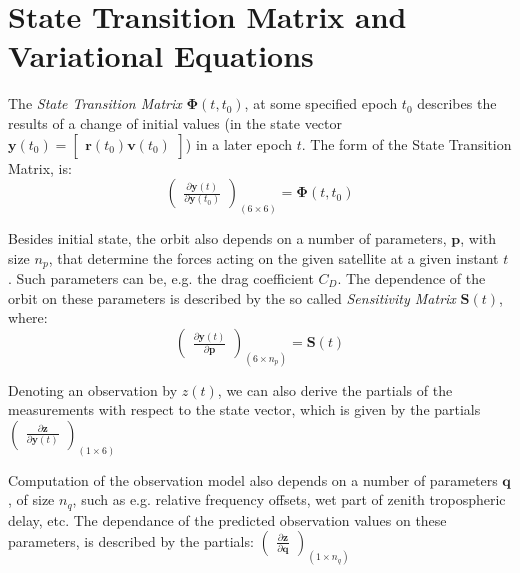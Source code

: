 \chapter{State Transition Matrix and Variational Equations}
\label{ch:state-transition-matrix-and-variational-equations}

The \emph{State Transition Matrix} $\bm{\Phi} (t, t_0 )$, at some specified epoch $t_0$ 
describes the results of a change of initial values (in the state vector 
$\bm{y}(t_0) = \begin{bmatrix} \bm{r}(t_0) \bm{v}(t_0) \end{bmatrix}$)
in a later epoch $t$. The form of the State Transition Matrix, is:
\begin{equation}
  \begin{pmatrix}
    \frac{\partial \bm{y}(t)}{\partial \bm{y}(t_0)}
  \end{pmatrix}_{(6 \times 6)}
  = \bm{\Phi} (t, t_0)
\end{equation}

Besides initial state, the orbit also depends on a number of parameters, 
$\bm{p}$, with size $n_p$, that determine the forces acting on the given 
satellite at a given instant $t$. Such parameters can be, e.g. the drag 
coefficient $C_D$. The dependence of the orbit on these parameters is 
described by the so called \emph{Sensitivity Matrix} $\bm{S}(t)$, where:
\begin{equation}
  \begin{pmatrix}
    \frac{\partial \bm{y}(t)}{\partial \bm{p}}
  \end{pmatrix}_{(6 \times n_p)}
  = \bm{S} (t)
\end{equation}

Denoting an observation by $z(t)$, we can also derive the partials of the 
measurements with respect to the state vector, which is given by the partials
$ \begin{pmatrix} \frac{\partial \bm{z}}{\partial \bm{y}(t)} \end{pmatrix}_{(1 \times 6)}$

Computation of the observation model also depends on a number of 
parameters $\bm{q}$, of size $n_q$, such as e.g. relative frequency offsets, 
wet part of zenith tropospheric delay, etc. The dependance of the predicted 
observation values on these parameters, is described by the partials:
$ \begin{pmatrix} \frac{\partial \bm{z}}{\partial \bm{q}} \end{pmatrix}_{(1 \times n_q)}$

